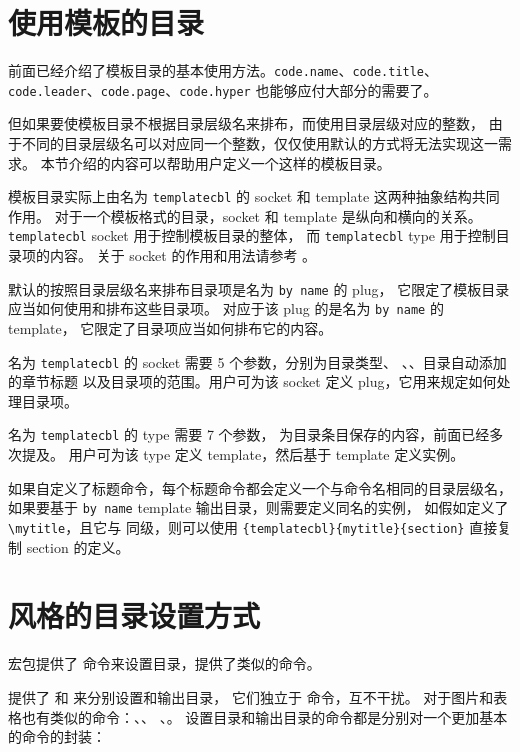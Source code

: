 \documentclass{cusdoc}
\begin{document}
\section{使用模板的目录}\label{sec:template-cbl}

前面已经介绍了模板目录的基本使用方法。\texttt{code.name}、\texttt{code.title}、
\texttt{code.leader}、\texttt{code.page}、\texttt{code.hyper} 也能够应付大部分的需要了。

但如果要使模板目录不根据目录层级名来排布，而使用目录层级对应的整数，
由于不同的目录层级名可以对应同一个整数，仅仅使用默认的方式将无法实现这一需求。
本节介绍的内容可以帮助用户定义一个这样的模板目录。

模板目录实际上由名为 \texttt{templatecbl} 的 socket 和 template 这两种抽象结构共同作用。
对于一个模板格式的目录，socket 和 template 是纵向和横向的关系。
\texttt{templatecbl} socket 用于控制模板目录的整体，
而 \texttt{templatecbl} type 用于控制目录项的内容。
关于 socket 的作用和用法请参考 。

默认的按照目录层级名来排布目录项是名为 \verb|by name| 的 plug，
它限定了模板目录应当如何使用和排布这些目录项。
对应于该 plug 的是名为 \verb|by name| 的 template，
它限定了目录项应当如何排布它的内容。

名为 \texttt{templatecbl} 的 socket 需要 5 个参数，分别为目录类型、
、、目录自动添加的章节标题
以及目录项的范围。用户可为该 socket 定义 plug，它用来规定如何处理目录项。

名为 \texttt{templatecbl} 的 type 需要 7 个参数，
为目录条目保存的内容，前面已经多次提及。
用户可为该 type 定义 template，然后基于 template 定义实例。

如果自定义了标题命令，每个标题命令都会定义一个与命令名相同的目录层级名，
如果要基于 \texttt{by name} template 输出目录，则需要定义同名的实例，
如假如定义了 \verb|\mytitle|，且它与  同级，则可以使用
 \verb|{templatecbl}{mytitle}{section}| 
直接复制 section 的定义。


\section{风格的目录设置方式}

 宏包提供了  命令来设置目录，\CusTeX 提供了类似的命令。

\CusTeX 提供了  和  来分别设置和输出目录，
它们独立于  命令，互不干扰。
对于图片和表格也有类似的命令：、、
、。
设置目录和输出目录的命令都是分别对一个更加基本的命令的封装：
\begin{xample}
\newcommand{\tocsetstyle}{\SetSpecifiedCombinedListStyle[toc]}
\newcommand{\specifiedtoc}{\SpecifiedCombinedList[toc]}
\newcommand{\lofsetstyle}{\SetSpecifiedCombinedListStyle[lof]{figure}}
\newcommand{\specifiedlof}{\SpecifiedCombinedList[lof]}
\newcommand{\lotsetstyle}{\SetSpecifiedCombinedListStyle[lot]{table}}
\newcommand{\specifiedlot}{\SpecifiedCombinedList[lot]}
\stopxamplecode
\xamplecode \medskip
\end{xample}
\end{document}
